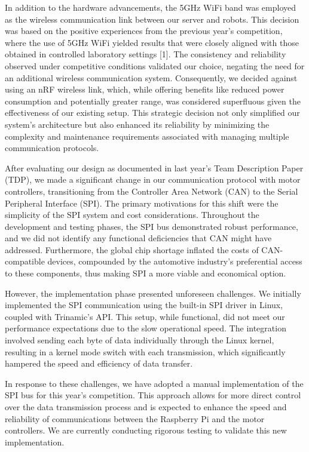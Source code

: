 \documentclass[runningheads]{llncs}
\begin{document}
In addition to the hardware advancements, the 5GHz WiFi band was employed as the wireless communication link between our server and robots. This decision was based on the positive experiences from the previous year's competition, where the use of 5GHz WiFi yielded results that were closely aligned with those obtained in controlled laboratory settings [1]. The consistency and reliability observed under competitive conditions validated our choice, negating the need for an additional wireless communication system. Consequently, we decided against using an nRF wireless link, which, while offering benefits like reduced power consumption and potentially greater range, was considered superfluous given the effectiveness of our existing setup. This strategic decision not only simplified our system's architecture but also enhanced its reliability by minimizing the complexity and maintenance requirements associated with managing multiple communication protocols.

After evaluating our design as documented in last year's Team Description Paper (TDP), we made a significant change in our communication protocol with motor controllers, transitioning from the Controller Area Network (CAN) to the Serial Peripheral Interface (SPI). The primary motivations for this shift were the simplicity of the SPI system and cost considerations. Throughout the development and testing phases, the SPI bus demonstrated robust performance, and we did not identify any functional deficiencies that CAN might have addressed. Furthermore, the global chip shortage inflated the costs of CAN-compatible devices, compounded by the automotive industry's preferential access to these components, thus making SPI a more viable and economical option.

However, the implementation phase presented unforeseen challenges. We initially implemented the SPI communication using the built-in SPI driver in Linux, coupled with Trinamic's API. This setup, while functional, did not meet our performance expectations due to the slow operational speed. The integration involved sending each byte of data individually through the Linux kernel, resulting in a kernel mode switch with each transmission, which significantly hampered the speed and efficiency of data transfer.

In response to these challenges, we have adopted a manual implementation of the SPI bus for this year's competition. This approach allows for more direct control over the data transmission process and is expected to enhance the speed and reliability of communications between the Raspberry Pi and the motor controllers. We are currently conducting rigorous testing to validate this new implementation.
\end{document}
